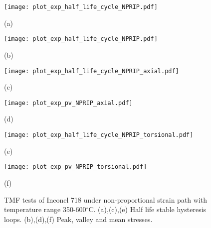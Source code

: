 \begin{figure}
  \begin{minipage}[t]{0.5\linewidth} %
  \nonumber
    \centering
    \texttt{[image: plot\_exp\_half\_life\_cycle\_NPRIP.pdf]}
    \centerline{(a)}
  \end{minipage}%
  \begin{minipage}[t]{0.5\linewidth}
    \centering
    \texttt{[image: plot\_exp\_half\_life\_cycle\_NPRIP.pdf]}
    \centerline{(b)}
  \end{minipage}

  \begin{minipage}[t]{0.5\linewidth} %
  \nonumber
    \centering
    \texttt{[image: plot\_exp\_half\_life\_cycle\_NPRIP\_axial.pdf]}
    \centerline{(c)}
  \end{minipage}%
  \begin{minipage}[t]{0.5\linewidth}
    \centering
    \texttt{[image: plot\_exp\_pv\_NPRIP\_axial.pdf]}
    \centerline{(d)}
  \end{minipage}

  \begin{minipage}[t]{0.5\linewidth} %
  \nonumber
    \centering
    \texttt{[image: plot\_exp\_half\_life\_cycle\_NPRIP\_torsional.pdf]}
    \centerline{(e)}
  \end{minipage}%
  \begin{minipage}[t]{0.5\linewidth}
    \centering
    \texttt{[image: plot\_exp\_pv\_NPRIP\_torsional.pdf]}
    \centerline{(f)}
  \end{minipage}
  \caption{TMF tests of Inconel 718 under non-proportional strain path with temperature range 350-600$^{\circ}$C.
  (a),(c),(e) Half life stable hysteresis loops.
  (b),(d),(f) Peak, valley and mean stresses.}
  \label{Fig:plot_exp_TCTMF}
\end{figure}

